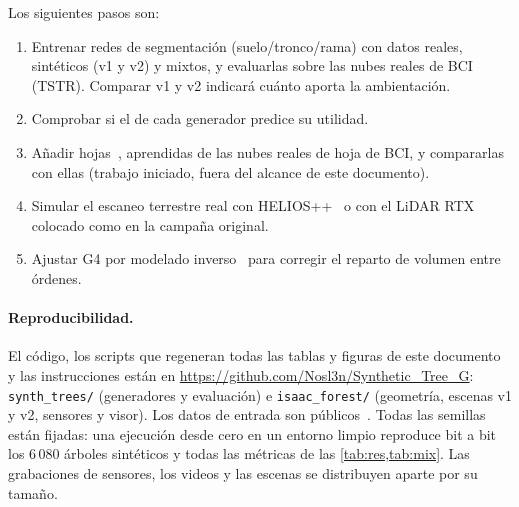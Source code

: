 \documentclass[11pt,a4paper]{article}
\newcommand{\NNA}{\text{1-NNA}}
\begin{document}
Los siguientes pasos son:
\begin{enumerate}
  \item Entrenar redes de segmentación (suelo/tronco/rama) con datos reales, sintéticos (v1 y v2) y mixtos, y evaluarlas sobre las nubes reales de BCI (TSTR). Comparar v1 y v2 indicará cuánto aporta la ambientación.
  \item Comprobar si el \NNA{} de cada generador predice su utilidad.
  \item Añadir hojas~\cite{akerblom2018leaf}, aprendidas de las nubes reales de hoja de BCI, y compararlas con ellas (trabajo iniciado, fuera del alcance de este documento).
  \item Simular el escaneo terrestre real con HELIOS++~\cite{winiwarter2022helios} o con el LiDAR RTX colocado como en la campaña original.
  \item Ajustar G4 por modelado inverso~\cite{stava2014inverse} para corregir el reparto de volumen entre órdenes.
\end{enumerate}

\paragraph{Reproducibilidad.} El código, los scripts que regeneran todas las tablas y figuras de este documento y las instrucciones están en \url{https://github.com/Nosl3n/Synthetic_Tree_G}: \texttt{synth\_trees/} (generadores y evaluación) e \texttt{isaac\_forest/} (geometría, escenas v1 y v2, sensores y visor). Los datos de entrada son públicos~\cite{krishnamoorthy2022data}. Todas las semillas están fijadas: una ejecución desde cero en un entorno limpio reproduce bit a bit los 6\,080 árboles sintéticos y todas las métricas de las \cref{tab:res,tab:mix}. Las grabaciones de sensores, los videos y las escenas se distribuyen aparte por su tamaño.

\printbibliography[title={Referencias}]
\end{document}
